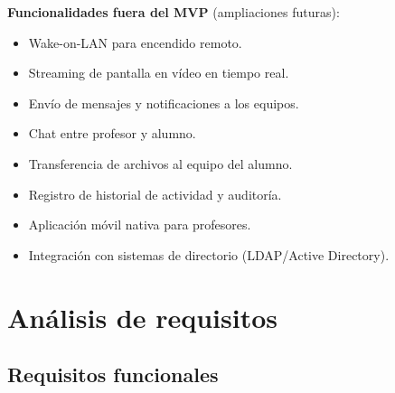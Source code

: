 \documentclass[12pt, a4paper, twoside]{article}
\begin{document}
\textbf{Funcionalidades fuera del MVP} (ampliaciones futuras):

\begin{itemize}
  \item Wake-on-LAN para encendido remoto.
  \item Streaming de pantalla en vídeo en tiempo real.
  \item Envío de mensajes y notificaciones a los equipos.
  \item Chat entre profesor y alumno.
  \item Transferencia de archivos al equipo del alumno.
  \item Registro de historial de actividad y auditoría.
  \item Aplicación móvil nativa para profesores.
  \item Integración con sistemas de directorio (LDAP/Active Directory).
\end{itemize}

\section{Análisis de requisitos}

\subsection{Requisitos funcionales}
\end{document}
